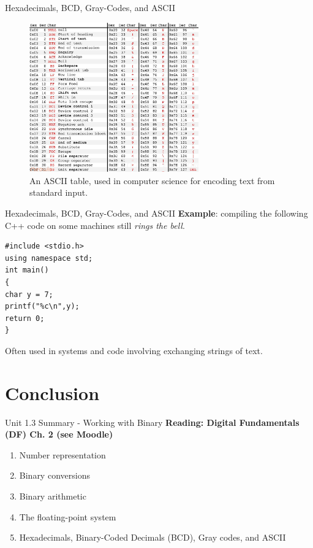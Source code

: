\documentclass{beamer}
\begin{document}
\begin{frame}{Hexadecimals, BCD, Gray-Codes, and ASCII}
\begin{figure}
\centering
\includegraphics[width=0.65\textwidth]{figures/ascii.jpg}
\caption{\label{fig:ascii} \small An ASCII table, used in computer science for encoding text from standard input.}
\end{figure}
\end{frame}

\begin{frame}[fragile]{Hexadecimals, BCD, Gray-Codes, and ASCII}
\textbf{Example}: compiling the following C++ code on some machines still \textit{rings the bell}.
\begin{verbatim}
#include <stdio.h>
using namespace std;
int main()
{
char y = 7;
printf("%c\n",y);
return 0;
}
\end{verbatim}
\small
Often used in systems and code involving exchanging strings of text.
\end{frame}

\section{Conclusion}

\begin{frame}{Unit 1.3 Summary - Working with Binary}
\textbf{Reading: Digital Fundamentals (DF) Ch. 2 (see Moodle)}
\begin{enumerate}
\item Number representation
\item Binary conversions
\item Binary arithmetic
\item The floating-point system
\item Hexadecimals, Binary-Coded Decimals (BCD), Gray codes, and ASCII
\end{enumerate}
\end{frame}
\end{document}
